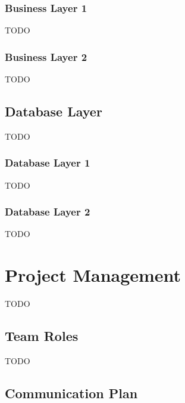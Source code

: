 \documentclass[a4paper,11pt]{article}
\begin{document}
    \subsubsection{Business Layer 1}
        TODO
    \subsubsection{Business Layer 2}
        TODO
        
    \vspace{0.5cm}
    \subsection{Database Layer}
        TODO
    \subsubsection{Database Layer 1}
        TODO
    \subsubsection{Database Layer 2}
        TODO

    \clearpage %
    \section{Project Management}\label{sec:projectmanagement}
        TODO
        
    \vspace{0.5cm}
    \subsection{Team Roles}
        TODO
        
    \vspace{0.5cm}
    \subsection{Communication Plan}
\end{document}
